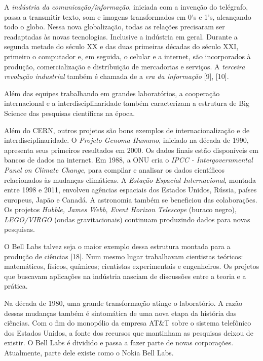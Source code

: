 \documentclass{hipatia}
\begin{document}
	A \textit{indústria da comunicação/informação}, iniciada com a invenção do telégrafo, passa a transmitir texto, som e imagens transformados em 0’s e 1’s, alcançando todo o globo. Nessa nova globalização, todas as relações precisaram ser readaptadas às novas tecnologias. Inclusive a indústria em geral. Durante a segunda metade do século XX e das duas primeiras décadas do século XXI, primeiro o computador e, em seguida, o celular e a internet, são incorporados à produção, comercialização e distribuição de mercadorias e serviços. A \textit{terceira revolução industrial} também é chamada de a \textit{era da informação} 	[9], 	[10].

Além das equipes trabalhando em grandes laboratórios, a cooperação internacional e a interdisciplinaridade também caracterizam a estrutura de Big Science das pesquisas científicas na época.

Além do CERN, outros projetos são bons exemplos de internacionalização e de interdisciplinaridade. O \textit{Projeto Genoma Humano}, iniciado na década de 1990, apresenta seus primeiros resultados em 2000. Os dados finais estão disponíveis em bancos de dados na internet. Em 1988, a ONU cria o \textit{IPCC - Intergovernmental Panel on Climate Change}, para compilar e analisar os dados científicos relacionados às mudanças climáticas. A \textit{Estação Espacial Internacional}, montada entre 1998 e 2011, envolveu agências espaciais dos Estados Unidos, Rússia, países europeus, Japão e Canadá. A astronomia também se beneficiou das colaborações. Os projetos \textit{Hubble, James Webb, Event Horizon Telescope} (buraco negro), \textit{LEGO/VIRGO} (ondas gravitacionais) continuam produzindo dados para novas pesquisas.

O Bell Labs talvez seja o maior exemplo dessa estrutura montada para a produção de ciências 	[18]. Num mesmo lugar trabalhavam cientistas teóricos: matemáticos, físicos, químicos; cientistas experimentais e engenheiros. Os projetos que buscavam aplicações na indústria nasciam de discussões entre a teoria e a prática.

Na década de 1980, uma grande transformação atinge o laboratório. A razão dessas mudanças também é sintomática de uma nova etapa da história das ciências. Com o fim do monopólio da empresa AT\&T sobre o sistema telefônico dos Estados Unidos, a fonte dos recursos que mantinham as pesquisas deixou de existir. O Bell Labs é dividido e passa a fazer parte de novas corporações. Atualmente, parte dele existe como o Nokia Bell Labs.
\end{document}
